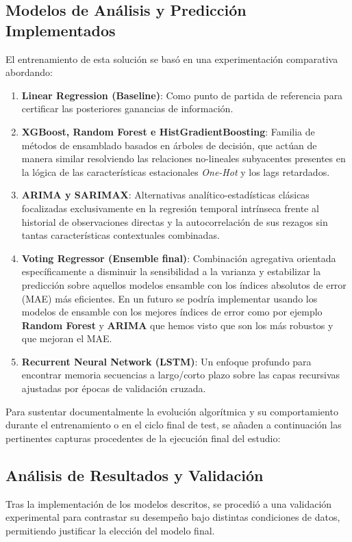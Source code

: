 \subsection{Modelos de Análisis y Predicción Implementados}
El entrenamiento de esta solución se basó en una experimentación comparativa abordando:
\begin{enumerate}
    \item \textbf{Linear Regression (Baseline)}: Como punto de partida de referencia para certificar las posteriores ganancias de información.
    \item \textbf{XGBoost, Random Forest e HistGradientBoosting}: Familia de métodos de ensamblado basados en árboles de decisión, que actúan de manera similar resolviendo las relaciones no-lineales subyacentes presentes en la lógica de las características estacionales \textit{One-Hot} y los lags retardados.
    \item \textbf{ARIMA y SARIMAX}: Alternativas analítico-estadísticas clásicas focalizadas exclusivamente en la regresión temporal intrínseca frente al historial de observaciones directas y la autocorrelación de sus rezagos sin tantas características contextuales combinadas.
    \item \textbf{Voting Regressor (Ensemble final)}: Combinación agregativa orientada específicamente a disminuir la sensibilidad a la varianza y estabilizar la predicción sobre aquellos modelos ensamble con los índices absolutos de error (MAE) más eficientes. En un futuro se podría implementar usando los modelos de ensamble con los mejores índices de error como por ejemplo \textbf{Random Forest} y \textbf{ARIMA} que hemos visto que son los más robustos y que mejoran el MAE.
    \item \textbf{Recurrent Neural Network (LSTM)}: Un enfoque profundo para encontrar memoria secuencias a largo/corto plazo sobre las capas recursivas ajustadas por épocas de validación cruzada.
\end{enumerate}

Para sustentar documentalmente la evolución algorítmica y su comportamiento durante el entrenamiento o en el ciclo final de test, se añaden a continuación las pertinentes capturas procedentes de la ejecución final del estudio:

\subsection{Análisis de Resultados y Validación}

Tras la implementación de los modelos descritos, se procedió a una validación experimental para contrastar su desempeño bajo distintas condiciones de datos, permitiendo justificar la elección del modelo final.

